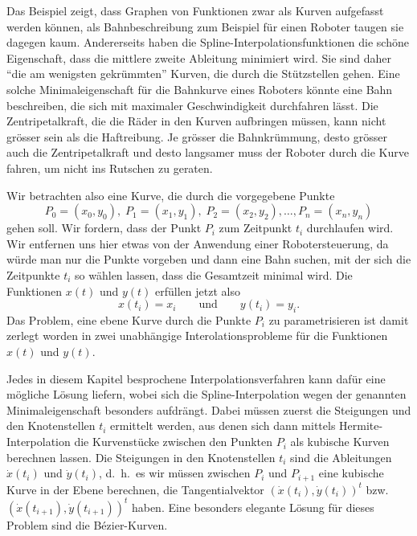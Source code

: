 Das Beispiel zeigt, dass Graphen von Funktionen zwar als Kurven aufgefasst
werden können, als Bahnbeschreibung zum Beispiel für einen Roboter taugen
sie dagegen kaum.
%
Andererseits haben die Spline-Interpolationsfunktionen die schöne
Eigenschaft, dass die mittlere zweite Ableitung minimiert wird.
Sie sind daher ``die am wenigsten gekrümmten'' Kurven, die durch die
Stützstellen gehen. 
Eine solche Minimaleigenschaft für die Bahnkurve eines Roboters könnte eine
Bahn beschreiben, die sich mit maximaler Geschwindigkeit durchfahren lässt.
Die Zentripetalkraft, die die Räder in den Kurven aufbringen müssen,
kann nicht grösser sein als die Haftreibung.
Je grösser die Bahnkrümmung, desto grösser auch die Zentripetalkraft und
desto langsamer muss der Roboter durch die Kurve fahren, um nicht ins
Rutschen zu geraten.
%
%
%

Wir betrachten also eine Kurve, die durch die vorgegebene Punkte
\[
P_0 = (x_0, y_0),\;
P_1 = (x_1, y_1), \;
P_2 = (x_2, y_2),
\dots,
P_n=(x_n, y_n)
\]
gehen soll.
Wir fordern, dass der Punkt $P_i$ zum Zeitpunkt $t_i$ durchlaufen wird.
Wir entfernen uns hier etwas von der Anwendung einer Robotersteuerung,
da würde man nur die Punkte vorgeben und dann eine Bahn suchen, mit der
sich die Zeitpunkte $t_i$ so wählen lassen, dass die Gesamtzeit minimal
wird.
Die Funktionen $x(t)$ und $y(t)$ erfüllen jetzt also
\[
x(t_i) = x_i
\qquad\text{und}\qquad
y(t_i) = y_i.
\]
Das Problem, eine ebene Kurve durch die Punkte $P_i$ zu parametrisieren
ist damit zerlegt worden in zwei unabhängige Interolationsprobleme
für die Funktionen $x(t)$ und $y(t)$.

Jedes in diesem Kapitel besprochene Interpolationsverfahren kann dafür
eine mögliche Lösung liefern, wobei sich die Spline-Interpolation wegen
der genannten Minimaleigenschaft besonders aufdrängt.
Dabei müssen zuerst die Steigungen und den Knotenstellen $t_i$ ermittelt
werden,
aus denen sich dann mittels Hermite-Interpolation die Kurvenstücke
zwischen den Punkten $P_i$ als kubische Kurven berechnen lassen.
%
Die Steigungen in den Knotenstellen $t_i$ sind die Ableitungen
$\dot{x}(t_i)$ und $\dot{y}(t_i)$, d.~h.~es wir müssen zwischen
$P_i$ und $P_{i+1}$ eine kubische Kurve in der Ebene berechnen, die
Tangentialvektor $(\dot{x}(t_i),\dot{y}(t_i))^t$
bzw.~$(\dot{x}(t_{i+1}),\dot{y}(t_{i+1}))^t$ haben.
Eine besonders elegante Lösung für dieses Problem sind die Bézier-Kurven.
%

